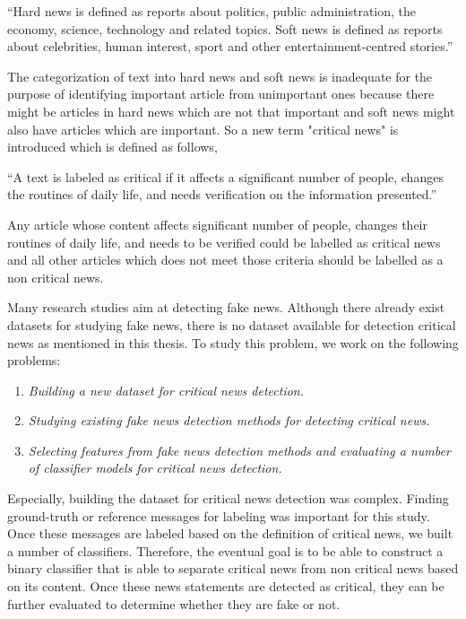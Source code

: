 \enquote{Hard news is defined as reports about politics, public administration, the economy, science, technology and related topics. Soft news is defined as reports about celebrities, human interest, sport and other entertainment-centred stories.}

The categorization of text into hard news and soft news is inadequate for the purpose of identifying important article from unimportant ones because there might be articles in hard news which are not that important and soft news might also have articles which are important. So a new term "critical news" is introduced which is defined as follows,

\enquote{A text is labeled as critical if it affects a significant number of people, changes the routines of daily life, and needs verification on the information presented.}

Any article whose content affects significant number of people, changes their routines of daily life, and needs to be verified could be labelled as critical news and all other articles which does not meet those criteria should be labelled as a non critical news. 

Many research studies aim at detecting fake news. Although there already exist datasets for studying fake news, there is no dataset available for detection critical news as mentioned in this thesis. To study this problem, we work on the following problems:

\begin{enumerate}
    \item \textit{Building a new dataset for critical news detection.}
    \item \textit{Studying existing fake news detection methods for detecting critical news.}
    \item \textit{Selecting features from fake news detection methods and evaluating a number of classifier models for critical news detection.}
\end{enumerate}

Especially, building the dataset for critical news detection was complex. Finding ground-truth or reference messages for labeling was important for this study. Once these messages are labeled based on the definition of critical news, we built a number of classifiers. Therefore, the eventual goal is to be able to construct a binary classifier that is able to separate critical news from non critical news based on its content. Once these news statements are detected as critical, they can be further evaluated to determine whether they are fake or not.


